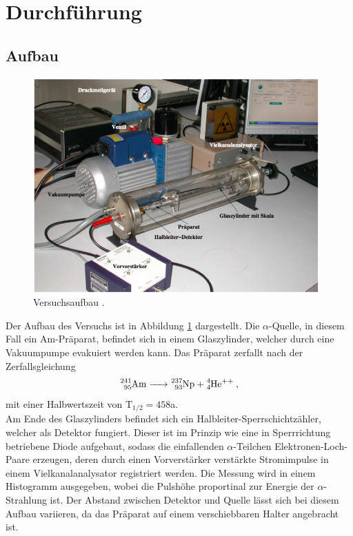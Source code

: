 \section{Durchführung}
\label{sec:Durchführung}
\subsection{Aufbau}
\begin{figure}
  \centering
  \includegraphics[width=11cm]{Aufbau.png}
  \caption{Versuchsaufbau \cite{skript}.}
  \label{fig:aufbau}
\end{figure}
Der Aufbau des Versuchs ist in Abbildung \ref{fig:aufbau} dargestellt.
Die $\alpha$-Quelle, in diesem Fall ein Am-Präparat, befindet sich
in einem Glaszylinder, welcher durch eine Vakuumpumpe evakuiert werden kann.
Das Präparat zerfallt nach der Zerfallsgleichung
\begin{equation}
  \ce{^{241}_{95}Am -> ^{237}_{93}Np + ^{4}_{4}He^{++}} \:,
  \label{eqn:reak}
\end{equation}
mit einer Halbwertszeit von $\text{T}_{1/2}= 458$a.\\
Am Ende des Glaszylinders befindet sich ein Halbleiter-Sperrschichtzähler, welcher
als Detektor fungiert. Dieser ist im Prinzip wie eine in Sperrrichtung betriebene
Diode aufgebaut, sodass die einfallenden $\alpha$-Teilchen Elektronen-Loch-Paare
erzeugen, deren durch einen Vorverstärker verstärkte Stromimpulse in einem
Vielkanalanalysator registriert werden. Die Messung wird in einem Histogramm ausgegeben,
wobei die Pulshöhe proportinal zur Energie der $\alpha$-Strahlung ist.
Der Abstand zwischen Detektor und Quelle lässt sich bei diesem Aufbau variieren, da das
Präparat auf einem verschiebbaren Halter angebracht ist.
